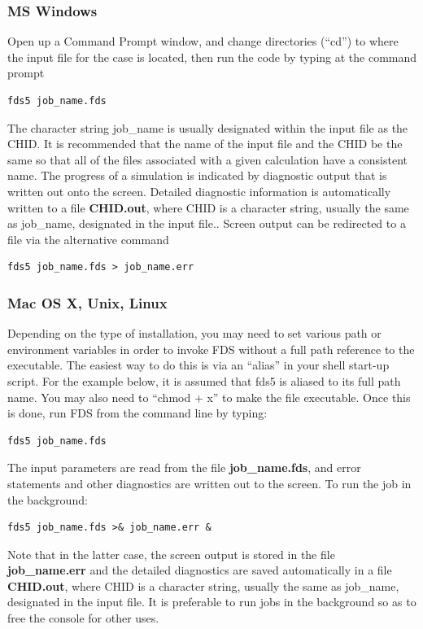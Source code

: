 \documentclass[11pt]{book}
\begin{document}
\subsubsection{MS Windows}

Open up a Command Prompt window, and change directories (``cd'') to where the
input file for the case is located, then run the code by typing at the command prompt
\begin{verbatim}
fds5 job_name.fds
\end{verbatim}
The character string {\ct job\_name} is usually
designated within the input file as the {\ct CHID}. It is recommended that the
name of the input file and the {\ct CHID} be the same so that all of the
files associated with a given calculation have a consistent name.
The progress of a simulation is indicated by diagnostic output that is written out onto the screen.
Detailed diagnostic information is automatically
written to a file {\bf CHID.out}, where {\ct CHID} is a character
string, usually the same as {\ct job\_name}, designated in the input file..
Screen output can be redirected to a file via the alternative command
\begin{verbatim}
fds5 job_name.fds > job_name.err
\end{verbatim}



\subsubsection{Mac OS X, Unix, Linux}

Depending on the type of installation, you may need to set various path or environment variables in order to invoke
FDS without a full path reference to the executable. The easiest way to do this is via an ``alias'' in your shell start-up
script. For the example below, it is assumed that {\ct fds5} is aliased to its full path name.
You may also need to ``chmod + x'' to make the file executable. Once this is done, run FDS from the command line by typing:
\begin{verbatim}
fds5 job_name.fds
\end{verbatim}
The input parameters are read from the file {\bf job\_name.fds},
and error statements and other diagnostics are written out to the screen.
To run the job in the background:
\begin{verbatim}
fds5 job_name.fds >& job_name.err &
\end{verbatim}


Note that in the latter case, the screen output is stored in the file {\bf job\_name.err} and the
detailed diagnostics are saved automatically in a file {\bf CHID.out}, where {\ct CHID} is a character
string, usually the same as {\ct job\_name}, designated in the input file.
It is preferable to run jobs in the background so as to free the console for other uses.
\end{document}
